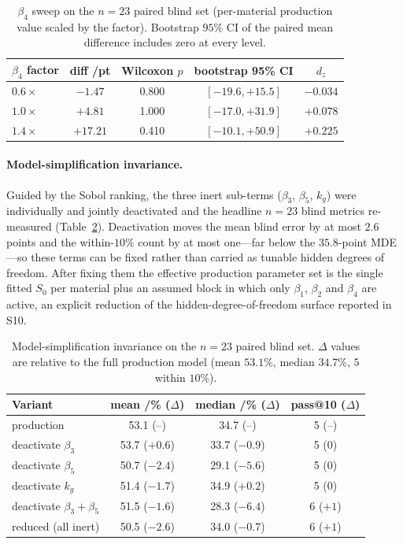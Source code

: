 \documentclass[11pt,a4paper,twocolumn]{article}
\begin{document}
\begin{table}[tp]
\centering
\caption{$\beta_4$ sweep on the $n = 23$ paired blind set (per-material production value scaled by the factor).
Bootstrap $95\%$ CI of the paired mean difference includes zero at every level.}
\label{tab:si_beta4_sweep}
\footnotesize
\begin{tabular}{lcccc}
\toprule
\textbf{$\beta_4$ factor} & \textbf{diff /pt} & \textbf{Wilcoxon $p$} & \textbf{bootstrap 95\% CI} & $d_z$ \\
\midrule
$0.6\times$ & $-1.47$ & 0.800 & $[-19.6, +15.5]$ & $-0.034$ \\
$1.0\times$ & $+4.81$ & 1.000 & $[-17.0, +31.9]$ & $+0.078$ \\
$1.4\times$ & $+17.21$ & 0.410 & $[-10.1, +50.9]$ & $+0.225$ \\
\bottomrule
\end{tabular}
\end{table}

\paragraph{Model-simplification invariance.}
Guided by the Sobol ranking, the three inert sub-terms ($\beta_3$, $\beta_5$, $k_g$) were individually and
jointly deactivated and the headline $n = 23$ blind metrics re-measured (Table~\ref{tab:si_simplification}).
Deactivation moves the mean blind error by at most $2.6$ points and the within-$10\%$ count by at most one---far
below the $35.8$-point MDE---so these terms can be fixed rather than carried as tunable hidden degrees of freedom.
After fixing them the effective production parameter set is the single fitted $S_0$ per material plus an assumed
block in which only $\beta_1$, $\beta_2$ and $\beta_4$ are active, an explicit reduction of the
hidden-degree-of-freedom surface reported in S10.

\begin{table}[tp]
\centering
\caption{Model-simplification invariance on the $n = 23$ paired blind set. $\Delta$ values are relative to the
full production model (mean $53.1\%$, median $34.7\%$, $5$ within $10\%$).}
\label{tab:si_simplification}
\footnotesize
\begin{tabular}{lccc}
\toprule
\textbf{Variant} & mean /\% ($\Delta$) & median /\% ($\Delta$) & pass@10 ($\Delta$) \\
\midrule
production & 53.1 (--) & 34.7 (--) & 5 (--) \\
deactivate $\beta_3$ & 53.7 ($+0.6$) & 33.7 ($-0.9$) & 5 ($0$) \\
deactivate $\beta_5$ & 50.7 ($-2.4$) & 29.1 ($-5.6$) & 5 ($0$) \\
deactivate $k_g$ & 51.4 ($-1.7$) & 34.9 ($+0.2$) & 5 ($0$) \\
deactivate $\beta_3+\beta_5$ & 51.5 ($-1.6$) & 28.3 ($-6.4$) & 6 ($+1$) \\
reduced (all inert) & 50.5 ($-2.6$) & 34.0 ($-0.7$) & 6 ($+1$) \\
\bottomrule
\end{tabular}
\end{table}
\end{document}
